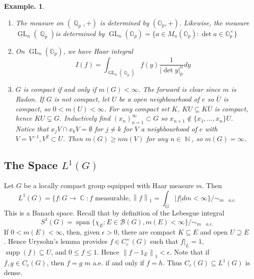 \documentclass[11pt, a4paper]{memoir}
\DeclareMathOperator{\N}{{\mathbb{N}}}
\DeclareMathOperator{\Q}{{\mathbb{Q}}}
\DeclareMathOperator{\R}{{\mathbb{R}}}
\DeclareMathOperator{\C}{{\mathbb{C}}}
\newcommand{\norm}[1]{\ensuremath{\left\lVert#1\right\rVert}}
\theoremstyle{change}
\theoremstyle{plain}
\theoremstyle{nonumberplain}
\newtheorem{example}{Example.}
\DeclareMathOperator{\GL}{GL}
\DeclareMathOperator{\spn}{span}
\DeclareMathOperator{\supp}{supp}
\numberwithin{equation}{section}
\begin{document}
\begin{example}
\begin{enumerate}[nl,r]
\begin{enumerate}[nl,a]
                    Thus, a closed non-open subgroup $H$ of $G$ is always $m$-locally null.
                    Hence, if $G$ is $\sigma$-compact, then closed non-open $H$ are $m$-null.
                    However, if $G=\R\times\R_d$, $H=\{0\}\times\R_d$ is closed, $m$-locally null, but not $m$-null.
            \end{enumerate}
        \item The measure on $(\Q_p,+)$ is determined by $(\mathbb{O}_p,+)$.
            Likewise, the measure $\GL_n(\Q_p)$is determined by $\GL_n(\mathbb{O}_p)=\{a\in M_n(\mathbb{O}_p):\det a\in\mathbb{O}_p^\times\}$
        \item On $\GL_n(\mathbb{O}_p)$, we have Haar integral
            \begin{equation*}
                I(f)=\int_{\GL_n(\Q_p)}f(y)\frac{1}{|\det y|_p^n}dy
            \end{equation*}
        \item $G$ is compact if and only if $m(G)<\infty$.
            The forward is clear since $m$ is Radon.
            If $G$ is not compact, let $U$ be a open neighbourhood of $e$ so $\overline{U}$ is compact, so $0<m(U)<\infty$.
            For any compact set $K$, $KU\subseteq K\overline{U}$ is compact, hence $KU\subsetneq G$.
            Inductively find $(x_n)_{n=1}^\infty\subset G$ so $x_{n+1}\notin\{x_1,\ldots,x_n\}U$.
            Notice that $x_jV\cap x_kV=\emptyset$ for $j\neq k$ for $V$ a neighbourhood of $e$ with $V=V^{-1},V^2\subset U$.
            Then $m(G)\geq nm(V)$ for any $n\in\N$, so $m(G)=\infty$.
    \end{enumerate}
\end{example}
\subsection{The Space \texorpdfstring{$L^1(G)$}{L1G}}
Let $G$ be a locally compact group equipped with Haar measure $m$.
Then
\begin{equation*}
    L^1(G)=\{f:G\to\C:f\text{ measurable},\norm{f}_1=\int_G|f|dm<\infty\}/\sim_{m\quad a.e.}
\end{equation*}
This is a Banach space.
Recall that by definition of the Lebesgue integral
\begin{equation*}
    S^1(G)=\spn\{\chi_E:E\in\mathcal{B}(G),m(E)<\infty\}/\sim_{m\quad a.e.}
\end{equation*}
If $0<m(E)<\infty$, then, given $\epsilon>0$, there are compact $K\subseteq E$ and open $U\supseteq E$.
Hence Urysohn's lemma provides $f\in C_c^+(G)$ such that $f|_L=1$, $\supp(f)\subseteq U$, and $0\leq f\leq 1$.
Hence $\norm{f-1_E}_1<\epsilon$.
Note that if $f,g\in C_c(G)$, then $f=g$ $m$ a.e. if and only if $f=h$.
Thus $C_c(G)\subseteq L^1(G)$ is dense.
\end{document}
